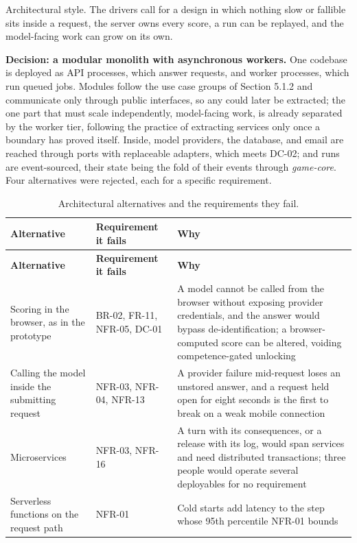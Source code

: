 Architectural style. The drivers call for a design in which nothing slow or fallible sits inside a request, the server owns every score, a run can be replayed, and the model-facing work can grow on its own.

\textbf{Decision: a modular monolith with asynchronous workers.} One codebase is deployed as API processes, which answer requests, and worker processes, which run queued jobs. Modules follow the use case groups of Section 5.1.2 and communicate only through public interfaces, so any could later be extracted; the one part that must scale independently, model-facing work, is already separated by the worker tier, following the practice of extracting services only once a boundary has proved itself\cite{r165}. Inside, model providers, the database, and email are reached through ports with replaceable adapters\cite{r152}, which meets DC-02; and runs are event-sourced\cite{r166}, their state being the fold of their events through \textit{game-core}. Four alternatives were rejected, each for a specific requirement.

{\small
\begin{longtable}{|>{\raggedright\arraybackslash}p{}|>{\raggedright\arraybackslash}p{}|>{\raggedright\arraybackslash}p{}|}
\caption{Architectural alternatives and the requirements they fail.} \\
\hline
\textbf{Alternative} & \textbf{Requirement it fails} & \textbf{Why} \\ \hline
\endfirsthead
\hline
\textbf{Alternative} & \textbf{Requirement it fails} & \textbf{Why} \\ \hline
\endhead
Scoring in the browser, as in the prototype & BR-02, FR-11, NFR-05, DC-01 & A model cannot be called from the browser without exposing provider credentials, and the answer would bypass de-identification; a browser-computed score can be altered, voiding competence-gated unlocking \\ \hline
Calling the model inside the submitting request & NFR-03, NFR-04, NFR-13 & A provider failure mid-request loses an unstored answer, and a request held open for eight seconds is the first to break on a weak mobile connection \\ \hline
Microservices & NFR-03, NFR-16 & A turn with its consequences, or a release with its log, would span services and need distributed transactions; three people would operate several deployables for no requirement \\ \hline
Serverless functions on the request path & NFR-01 & Cold starts add latency to the step whose 95th percentile NFR-01 bounds \\ \hline
\end{longtable}
}

